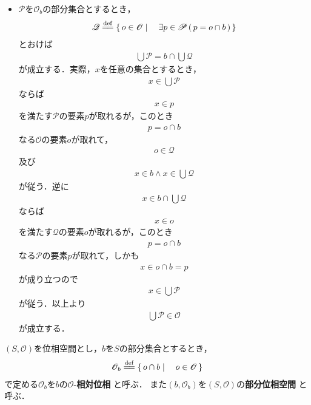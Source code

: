 \begin{itemize}
		\item $\mathscr{P}$を$\mathscr{O}_{b}$の部分集合とするとき，
			\begin{align}
				\mathscr{Q} \defeq \Set{o \in \mathscr{O}}{\exists p \in \mathscr{P}\,
				(\, p = o \cap b\, )}
			\end{align}
			とおけば
			\begin{align}
				\bigcup \mathscr{P} = b \cap \bigcup \mathscr{Q}
			\end{align}
			が成立する．実際，$x$を任意の集合とするとき，
			\begin{align}
				x \in \bigcup \mathscr{P}
			\end{align}
			ならば
			\begin{align}
				x \in p
			\end{align}
			を満たす$\mathscr{P}$の要素$p$が取れるが，このとき
			\begin{align}
				p = o \cap b
			\end{align}
			なる$\mathscr{O}$の要素$o$が取れて，
			\begin{align}
				o \in \mathscr{Q}
			\end{align}
			及び
			\begin{align}
				x \in b \wedge x \in \bigcup \mathscr{Q}
			\end{align}
			が従う．逆に
			\begin{align}
				x \in b \cap \bigcup \mathscr{Q}
			\end{align}
			ならば
			\begin{align}
				x \in o
			\end{align}
			を満たす$\mathscr{Q}$の要素$o$が取れるが，このとき
			\begin{align}
				p = o \cap b
			\end{align}
			なる$\mathscr{P}$の要素$p$が取れて，しかも
			\begin{align}
				x \in o \cap b = p
			\end{align}
			が成り立つので
			\begin{align}
				x \in \bigcup \mathscr{P}
			\end{align}
			が従う．以上より
			\begin{align}
				\bigcup \mathscr{P} \in \mathscr{O} 
			\end{align}
			が成立する．
	\end{itemize}
	
	\begin{screen}
		\begin{dfn}[相対位相]
			$(S,\mathscr{O})$を位相空間とし，$b$を$S$の部分集合とするとき，
			\begin{align}
				\mathscr{O}_{b} \defeq 
				\Set{o \cap b}{o \in \mathscr{O}}
			\end{align}
			で定める$\mathscr{O}_{b}$を$b$の$\mathscr{O}$-{\bf 相対位相}
			と呼ぶ．
			また$(b,\mathscr{O}_{b})$を$(S,\mathscr{O})の${\bf 部分位相空間}
			と呼ぶ．
		\end{dfn}
	\end{screen}
	
